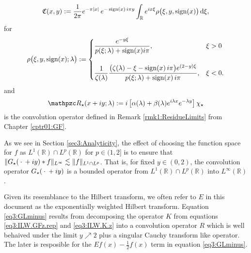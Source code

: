 \documentclass[../dissertation.tex]{subfiles}
\begin{document}
\begin{thm}
	\begin{align}\label{eq3:GFcont}
		\mathfrak C(x,y)
			:= \frac{1}{2\pi} e^{-\pi|x|} \, e^{- \operatorname{sign}(x) \, i \pi y }
				\int_{\mathbb R} e^{ix \xi} \rho\big(\xi, y, \operatorname{sign}(x)\big) \, \mathrm{d}\xi,
	\end{align}
	for
	\begin{align}\label{eq0:smallR}
		\rho\big(\xi, y, \operatorname{sign}(x); \lambda\big)
			:= 	
				\begin{cases}
					\dfrac{e^{-y\xi}}{p(\xi; \lambda) + \operatorname{sign}(x) i\pi}, & \xi > 0\\
					\\
					\dfrac{1}{\zeta(\lambda)} 
					\dfrac{\big(\zeta(\lambda)- \xi - \operatorname{sign}(x) \, i\pi \big)e^{(2-y)\xi} }
							{p(\xi; \lambda) + \operatorname{sign}(x) \, i\pi},
						&	\xi < 0.
				\end{cases}
	\end{align}
	and
	\begin{align}\label{eq3:mathpzcR}
		\mathpzc R_\star (x+iy; \lambda) 
			:= i 
				\left[
					\alpha(\lambda) 
					+ \beta(\lambda) e^{i\lambda x}e^{-\lambda y}
				\right] \chi_\star
	\end{align}
	is the convolution operator defined in Remark \ref{rmk1:ResidueLimits} from 
	Chapter \ref{cptr01:GF}.
\end{thm}

\begin{rmk}
	As we see in Section \ref{sec3:Analyticity}, the effect of choosing the 
	function space for $f$
	as $L^1(\mathbb R) \cap L^p(\mathbb R)$ for $p\in (1, 2]$ is to ensure that 
	$\|G_\star(\kern 0.5ex \cdot \kern 0.5ex + iy) *f \|_{L^\infty} \lesssim \|f\|_{L^1\cap L^p}$. That is, 
	for fixed $y \in (0, 2)$, the convolution operator $G_\star(\kern 0.5ex \cdot \kern 0.5ex+iy)$ is 
	a bounded operator from $L^1(\mathbb R) \cap L^p(\mathbb R)$ into 
	$L^\infty(\mathbb R)$.
\end{rmk}

Given its resemblance to the Hilbert transform, we often refer to $E$ in this 
document as the exponentially weighted Hilbert transform. Equation 
\eqref{eq3:GLminus} results from decomposing the operator $K$ from equations 
\eqref{eq3:ILW.GFz.rep} and \eqref{eq3:ILW.K.z} into a convolution operator 
$R$ which is well behaived under the limit $y\nearrow 2$ plus a singular Cauchy 
transform like operator. The later is resposible for the 
$Ef(x) - \frac{1}{2} f(x)$ term in equation \eqref{eq3:GLminus}.
\end{document}
